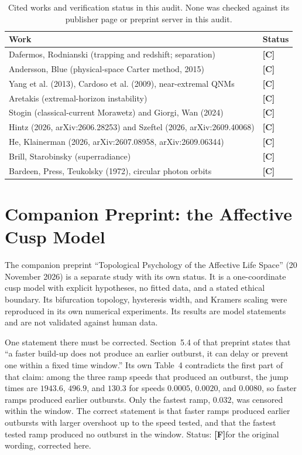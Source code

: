 \documentclass[11pt, a4paper]{article}
\newcommand{\CC}{\textcolor{cc}{\textbf{[C]}}}
\newcommand{\FF}{\textcolor{ff}{\textbf{[F]}}}
\theoremstyle{remark}
\theoremstyle{definition}
\begin{document}
\begin{table}[H]
\centering
\caption{Cited works and verification status in this audit. None was checked against its publisher page or preprint server in this audit.}
\label{tab:refs}
\small
\begin{tabular}{@{}p{7.2cm}p{5.4cm}@{}}
\toprule
Work & Status \\
\midrule
Dafermos, Rodnianski (trapping and redshift; separation) & \CC \\
Andersson, Blue (physical-space Carter method, 2015) & \CC \\
Yang et al. (2013), Cardoso et al. (2009), near-extremal QNMs & \CC \\
Aretakis (extremal-horizon instability) & \CC \\
Stogin (classical-current Morawetz) and Giorgi, Wan (2024) & \CC \\
Hintz (2026, arXiv:2606.28253) and Szeftel (2026, arXiv:2609.40068) & \CC \\
He, Klainerman (2026, arXiv:2607.08958, arXiv:2609.06344) & \CC \\
Brill, Starobinsky (superradiance) & \CC \\
Bardeen, Press, Teukolsky (1972), circular photon orbits & \CC \\
\bottomrule
\end{tabular}
\end{table}

\section{Companion Preprint: the Affective Cusp Model}
\label{sec:companion}

The companion preprint ``Topological Psychology of the Affective Life Space'' (20 November 2026) is a separate study with its own status. It is a one-coordinate cusp model with explicit hypotheses, no fitted data, and a stated ethical boundary. Its bifurcation topology, hysteresis width, and Kramers scaling were reproduced in its own numerical experiments. Its results are model statements and are not validated against human data.

One statement there must be corrected. Section~5.4 of that preprint states that ``a faster build-up does not produce an earlier outburst, it can delay or prevent one within a fixed time window.'' Its own Table~4 contradicts the first part of that claim: among the three ramp speeds that produced an outburst, the jump times are $1943.6$, $496.9$, and $130.3$ for speeds $0.0005$, $0.0020$, and $0.0080$, so faster ramps produced earlier outbursts. Only the fastest ramp, $0.032$, was censored within the window. The correct statement is that faster ramps produced earlier outbursts with larger overshoot up to the speed tested, and that the fastest tested ramp produced no outburst in the window. Status: \FF for the original wording, corrected here.
\end{document}
